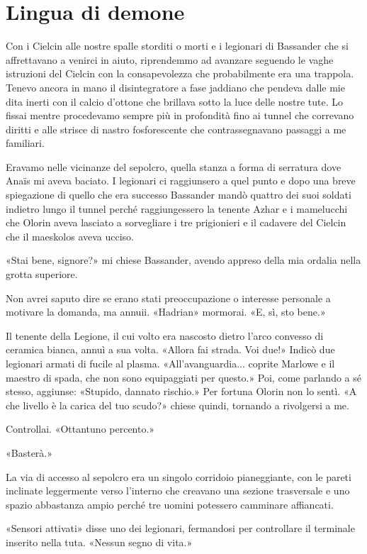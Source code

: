 \chapter{Lingua di demone}

Con i Cielcin alle nostre spalle storditi o morti e i legionari di
Bassander che si affrettavano a venirci in aiuto, riprendemmo ad
avanzare seguendo le vaghe istruzioni del Cielcin con la consapevolezza
che probabilmente era una trappola. Tenevo ancora in mano il
disintegratore a fase jaddiano che pendeva dalle mie dita inerti con il
calcio d'ottone che brillava sotto la luce delle nostre tute. Lo fissai
mentre procedevamo sempre più in profondità fino ai tunnel che correvano
diritti e alle strisce di nastro fosforescente che contrassegnavano
passaggi a me familiari.

Eravamo nelle vicinanze del sepolcro, quella stanza a forma di serratura
dove Anaïs mi aveva baciato. I legionari ci raggiunsero a quel punto e
dopo una breve spiegazione di quello che era successo Bassander mandò
quattro dei suoi soldati indietro lungo il tunnel perché raggiungessero
la tenente Azhar e i mamelucchi che Olorin aveva lasciato a sorvegliare
i tre prigionieri e il cadavere del Cielcin che il maeskolos aveva
ucciso.

«Stai bene, signore?» mi chiese Bassander, avendo appreso della mia
ordalia nella grotta superiore.

Non avrei saputo dire se erano stati preoccupazione o interesse
personale a motivare la domanda, ma annuii. «Hadrian» mormorai. «E, sì,
sto bene.»

Il tenente della Legione, il cui volto era nascosto dietro l'arco
convesso di ceramica bianca, annuì a sua volta. «Allora fai strada. Voi
due!» Indicò due legionari armati di fucile al plasma.
«All'avanguardia... coprite Marlowe e il maestro di spada, che non sono
equipaggiati per questo.» Poi, come parlando a sé stesso, aggiunse:
«Stupido, dannato rischio.» Per fortuna Olorin non lo sentì. «A che
livello è la carica del tuo scudo?» chiese quindi, tornando a rivolgersi
a me.

Controllai. «Ottantuno percento.»

«Basterà.»

La via di accesso al sepolcro era un singolo corridoio pianeggiante, con
le pareti inclinate leggermente verso l'interno che creavano una sezione
trasversale e uno spazio abbastanza ampio perché tre uomini potessero
camminare affiancati.

«Sensori attivati» disse uno dei legionari, fermandosi per controllare
il terminale inserito nella tuta. «Nessun segno di vita.»


